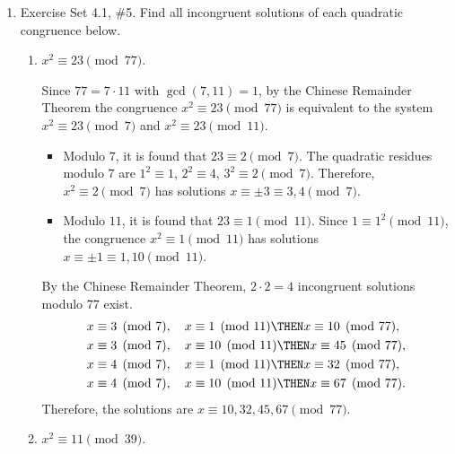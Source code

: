 











\newpage
\begin{enumerate}
  \item Exercise Set 4.1, \#5. Find all incongruent solutions of each quadratic congruence below.
  \begin{enumerate}
    \item $x^2 \equiv 23 \pmod{77}$. \\
    \begin{subanswer}
      Since $77=7\cdot 11$ with $\gcd(7,11)=1$, by the Chinese Remainder Theorem the congruence $x^2\equiv 23\pmod{77}$ is equivalent to the system $x^2\equiv 23\pmod{7}$ and $x^2\equiv 23\pmod{11}$.
      \begin{itemize}
        \item Modulo $7$, it is found that $23\equiv 2\pmod{7}$. The quadratic residues modulo $7$ are $1^2\equiv 1$, $2^2\equiv 4$, $3^2\equiv 2\pmod{7}$. Therefore, $x^2\equiv 2\pmod{7}$ has solutions $x\equiv \pm 3\equiv 3,4\pmod{7}$.
        \item Modulo $11$, it is found that $23\equiv 1\pmod{11}$. Since $1\equiv 1^2\pmod{11}$, the congruence $x^2\equiv 1\pmod{11}$ has solutions $x\equiv \pm 1\equiv 1,10\pmod{11}$.
      \end{itemize}
      By the Chinese Remainder Theorem, $2\cdot 2=4$ incongruent solutions modulo $77$ exist.
      \begin{align*}
        x &\equiv 3\pmod{7},\quad x\equiv 1\pmod{11} \THEN x\equiv 10\pmod{77},\\
        x &\equiv 3\pmod{7},\quad x\equiv 10\pmod{11} \THEN x\equiv 45\pmod{77},\\
        x &\equiv 4\pmod{7},\quad x\equiv 1\pmod{11} \THEN x\equiv 32\pmod{77},\\
        x &\equiv 4\pmod{7},\quad x\equiv 10\pmod{11} \THEN x\equiv 67\pmod{77}.
      \end{align*}
      Therefore, the solutions are $x\equiv 10,32,45,67\pmod{77}$.
    \end{subanswer}
    \item $x^2 \equiv 11 \pmod{39}$.

\end{enumerate}
\end{enumerate}
